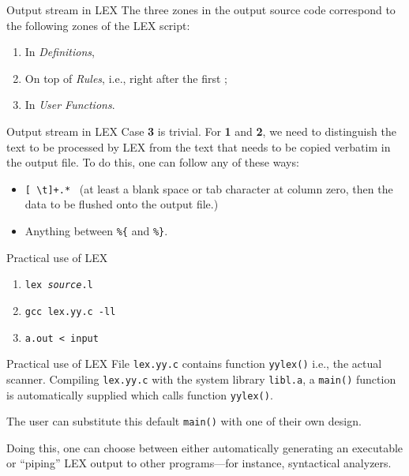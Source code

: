 \begin{frame}[fragile]{Output stream in LEX}
The three zones in the output source code correspond to the following
zones of the LEX script:
\begin{enumerate}
\item In {\em Definitions},
\item On top of {\em Rules\/}, i.e., right after the first \pcpc{};
\item In {\em User Functions}.
\end{enumerate}


\end{frame}
\begin{frame}[fragile]{Output stream in LEX}
Case {\bf 3} is trivial. For 
{\bf 1} and {\bf 2}, we need to distinguish the text to be processed
by LEX from the text that needs to be copied verbatim in the output file.
To do this, one can follow any of these ways:
\begin{itemize}
\item {\tt [ \verb"\"t]+.*} \ (at least a blank space or tab character
at column zero, then the data to be flushed onto the output file.)
\item Anything between \verb"%{" and \verb"%}".
\end{itemize}

\end{frame}
\begin{frame}[fragile]{Practical use of LEX}
\begin{enumerate}
\item {\tt lex {\em source}.l}
\item {\tt gcc lex.yy.c -ll}
\item {\tt a.out < input}
\end{enumerate}


\end{frame}
\begin{frame}[fragile]{Practical use of LEX}
File {\tt lex.yy.c} contains function  {\tt yylex()}
i.e., the actual scanner. Compiling
{\tt lex.yy.c} with the system library {\tt libl.a},
a {\tt main()} function is automatically supplied
which calls function {\tt yylex()}.


\vspace{20pt}

The user can substitute this default {\tt main()} with
one of their own design.


\vspace{20pt}

Doing this, one can choose between either
automatically generating an executable or
``piping'' LEX output to other programs---for instance,
syntactical analyzers.


\end{frame}
